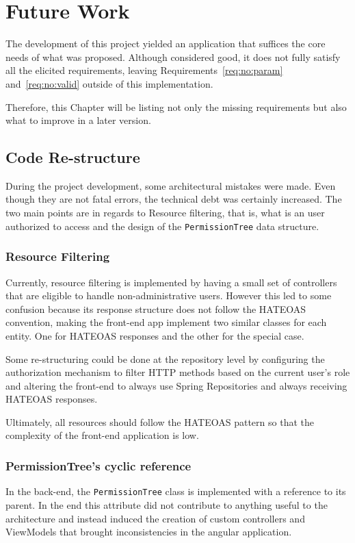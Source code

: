\chapter{Future Work}\label{chap:future}
The development of this project yielded an application that suffices the core needs of what was proposed. Although considered good, it does not fully satisfy all the elicited requirements, leaving Requirements~\ref{req:no:param} and~\ref{req:no:valid} outside of this implementation.

Therefore, this Chapter will be listing not only the missing requirements but also what to improve in a later version.

\section{Code Re-structure}
During the project development, some architectural mistakes were made. Even though they are not fatal errors, the technical debt was certainly increased. The two main points are in regards to Resource filtering, that is, what is an user authorized to access and the design of the \texttt{PermissionTree} data structure. 

\subsection{Resource Filtering}
Currently, resource filtering is implemented by having a small set of controllers that are eligible to handle non-administrative users. However this led to some confusion because its response structure does not follow the \gls{HATEOAS} convention, making the front-end app implement two similar classes for each entity. One for \gls{HATEOAS} responses and the other for the special case.

Some re-structuring could be done at the repository level by configuring the authorization mechanism to filter \gls{HTTP} methods based on the current user's role and altering the front-end to always use Spring Repositories and always receiving \gls{HATEOAS} responses.

Ultimately, all resources should follow the \gls{HATEOAS} pattern so that the complexity of the front-end application is low.

\subsection{PermissionTree's cyclic reference}
In the back-end, the \texttt{PermissionTree} class is implemented with a reference to its parent. In the end this attribute did not contribute to anything useful to the architecture and instead induced the creation of custom controllers and ViewModels that brought inconsistencies in the angular application.

